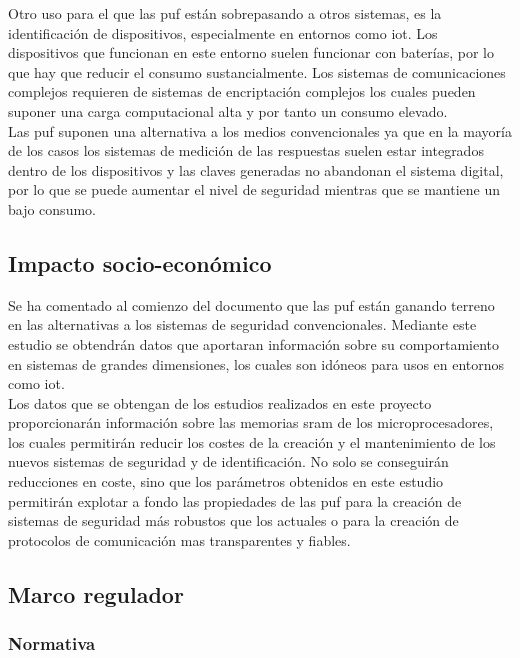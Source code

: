 \documentclass[spanish]{template/minim}
\begin{document}
Otro uso para el que las \gls{puf} están sobrepasando a otros sistemas, es la identificación de dispositivos, especialmente en entornos como \gls{iot}. Los dispositivos que funcionan en este entorno suelen funcionar con baterías, por lo que hay que reducir el consumo sustancialmente. Los sistemas de comunicaciones complejos requieren de sistemas de encriptación complejos los cuales pueden suponer una carga computacional alta y por tanto un consumo elevado.\\

Las \gls{puf} suponen una alternativa a los medios convencionales ya que en la mayoría de los casos los sistemas de medición de las respuestas suelen estar integrados dentro de los dispositivos y las claves generadas no abandonan el sistema digital, por lo que se puede aumentar el nivel de seguridad mientras que se mantiene un bajo consumo.\\

\subsection{Impacto socio-económico}

Se ha comentado al comienzo del documento que las \gls{puf} están ganando terreno en las alternativas a los sistemas de seguridad convencionales. Mediante este estudio se obtendrán datos que aportaran información sobre su comportamiento en sistemas de grandes dimensiones, los cuales son idóneos para usos en entornos como \gls{iot}.\\

Los datos que se obtengan de los estudios realizados en este proyecto proporcionarán información sobre las memorias sram de los microprocesadores, los cuales permitirán reducir los costes de la creación y el mantenimiento de los nuevos sistemas de seguridad y de identificación. No solo se conseguirán reducciones en coste, sino que los parámetros obtenidos en este estudio permitirán explotar a fondo las propiedades de las \gls{puf} para la creación de sistemas de seguridad más robustos que los actuales o para la creación de protocolos de comunicación mas transparentes y fiables.\\

\subsection{Marco regulador}\label{sec:norm}

\subsubsection{Normativa}
\end{document}
